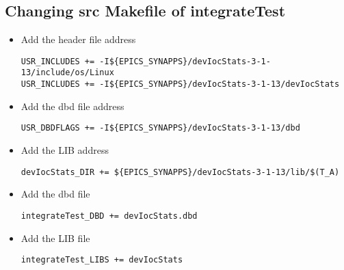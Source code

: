 \documentclass[11pt
  , a4paper
  , article
  , oneside
]{memoir}
\begin{document}
\subsection{Changing src Makefile of integrateTest}
\begin{itemize}
	\item Add the header file address
	\begin{lstlisting}[style=termstyle]
USR_INCLUDES += -I${EPICS_SYNAPPS}/devIocStats-3-1-13/include/os/Linux
USR_INCLUDES += -I${EPICS_SYNAPPS}/devIocStats-3-1-13/devIocStats
\end{lstlisting}
	\item Add the dbd file address
	\begin{lstlisting}[style=termstyle]
USR_DBDFLAGS += -I${EPICS_SYNAPPS}/devIocStats-3-1-13/dbd
\end{lstlisting}
	\item Add the LIB address
	\begin{lstlisting}[style=termstyle]
devIocStats_DIR += ${EPICS_SYNAPPS}/devIocStats-3-1-13/lib/$(T_A)
\end{lstlisting}
	\item Add the dbd file
	\begin{lstlisting}[style=termstyle]
integrateTest_DBD += devIocStats.dbd
\end{lstlisting}
	\item Add the LIB file
	\begin{lstlisting}[style=termstyle]
integrateTest_LIBS += devIocStats
\end{lstlisting}
\end{itemize}
\end{document}
